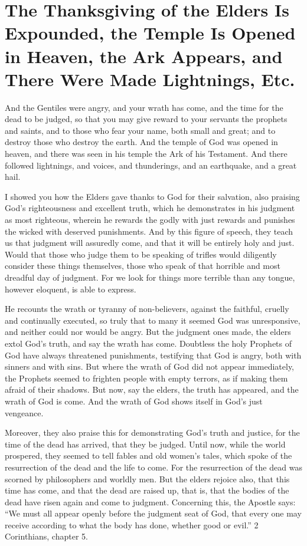 \chapter[Sermon 51. The Thanksgiving of the Elders Is Expounded, the Temple Is Opened in Heaven, the Ark Appears, and There Were Made Lightnings, Etc.]{The Thanksgiving of the Elders Is Expounded, the Temple Is Opened in Heaven, the Ark Appears, and There Were Made Lightnings, Etc.}
\label{sermon:051}

And the Gentiles were angry, and your wrath has come, and the time for the dead to be judged, so that you may give reward to your servants the prophets and saints, and to those who fear your name, both small and great; and to destroy those who destroy the earth. And the temple of God was opened in heaven, and there was seen in his temple the Ark of his Testament. And there followed lightnings, and voices, and thunderings, and an earthquake, and a great hail.

I showed you how the Elders gave thanks to God for their salvation, also praising God’s righteousness and excellent truth, which he demonstrates in his judgment as most righteous, wherein he rewards the godly with just rewards and punishes the wicked with deserved punishments. And by this figure of speech, they teach us that judgment will assuredly come, and that it will be entirely holy and just. Would that those who judge them to be speaking of trifles would diligently consider these things themselves, those who speak of that horrible and most dreadful day of judgment. For we look for things more terrible than any tongue, however eloquent, is able to express.

He recounts the wrath or tyranny of non-believers, against the faithful, cruelly and continually executed, so truly that to many it seemed God was unresponsive, and neither could nor would be angry. But the judgment ones made, the elders extol God’s truth, and say the wrath has come. Doubtless the holy Prophets of God have always threatened punishments, testifying that God is angry, both with sinners and with sins. But where the wrath of God did not appear immediately, the Prophets seemed to frighten people with empty terrors, as if making them afraid of their shadows. But now, say the elders, the truth has appeared, and the wrath of God is come. And the wrath of God shows itself in God’s just vengeance.

Moreover, they also praise this for demonstrating God’s truth and justice, for the time of the dead has arrived, that they be judged. Until now, while the world prospered, they seemed to tell fables and old women’s tales, which spoke of the resurrection of the dead and the life to come. For the resurrection of the dead was scorned by philosophers and worldly men. But the elders rejoice also, that this time has come, and that the dead are raised up, that is, that the bodies of the dead have risen again and come to judgment. Concerning this, the Apostle says: “We must all appear openly before the judgment seat of God, that every one may receive according to what the body has done, whether good or evil.” 2 Corinthians, chapter 5.

